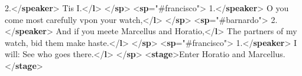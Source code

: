 \begin{shaded}
2.{</\textbf{speaker}>}\mbox{}\newline 
{}Tis I.{</\textbf{l}>}\mbox{}\newline 
{</\textbf{sp}>}\mbox{}\newline 
{<\textbf{sp}\hspace*{1em}{who}="{\#francisco}">}\mbox{}\newline 
{}1.{</\textbf{speaker}>}\mbox{}\newline 
{}O you come most carefully vpon your watch,{</\textbf{l}>}\mbox{}\newline 
{</\textbf{sp}>}\mbox{}\newline 
{<\textbf{sp}\hspace*{1em}{who}="{\#barnardo}">}\mbox{}\newline 
{}2.{</\textbf{speaker}>}\mbox{}\newline 
{}And if you meete Marcellus and Horatio,{</\textbf{l}>}\mbox{}\newline 
{}The partners of my watch, bid them make haste.{</\textbf{l}>}\mbox{}\newline 
{</\textbf{sp}>}\mbox{}\newline 
{<\textbf{sp}\hspace*{1em}{who}="{\#francisco}">}\mbox{}\newline 
{}1.{</\textbf{speaker}>}\mbox{}\newline 
{}I will: See who goes there.{</\textbf{l}>}\mbox{}\newline 
{</\textbf{sp}>}\mbox{}\newline 
{<\textbf{stage}>}Enter Horatio and Marcellus.{</\textbf{stage}>}\end{shaded}\egroup\par \par
